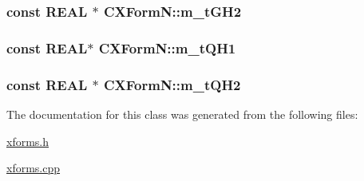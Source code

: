 \hypertarget{classCXFormN_ad325c1315bcb46879e0d11f666cb39be}{
\subsubsection[{m\-\_\-t\-G\-H2}]{\setlength{\rightskip}{0pt plus 5cm}const {\bf R\-E\-A\-L} $\ast$ C\-X\-Form\-N\-::m\-\_\-t\-G\-H2\hspace{0.3cm}{\ttfamily [protected]}}}\label{classCXFormN_ad325c1315bcb46879e0d11f666cb39be}
\hypertarget{classCXFormN_a6f01c6301382826855587cbf774d5dc3}{
\subsubsection[{m\-\_\-t\-Q\-H1}]{\setlength{\rightskip}{0pt plus 5cm}const {\bf R\-E\-A\-L}$\ast$ C\-X\-Form\-N\-::m\-\_\-t\-Q\-H1\hspace{0.3cm}{\ttfamily [protected]}}}\label{classCXFormN_a6f01c6301382826855587cbf774d5dc3}
\hypertarget{classCXFormN_ad82767332313de6c1107519a70cb2f66}{
\subsubsection[{m\-\_\-t\-Q\-H2}]{\setlength{\rightskip}{0pt plus 5cm}const {\bf R\-E\-A\-L} $\ast$ C\-X\-Form\-N\-::m\-\_\-t\-Q\-H2\hspace{0.3cm}{\ttfamily [protected]}}}\label{classCXFormN_ad82767332313de6c1107519a70cb2f66}


The documentation for this class was generated from the following files\-:\begin{DoxyCompactItemize}
\item 
\hyperlink{xforms_8h}{xforms.\-h}\item 
\hyperlink{xforms_8cpp}{xforms.\-cpp}\end{DoxyCompactItemize}
